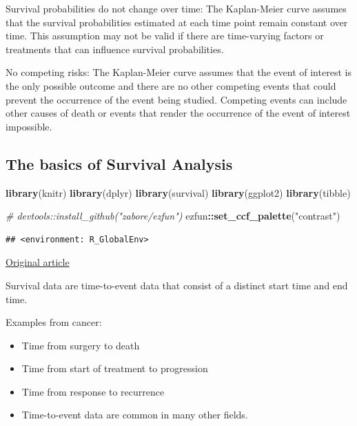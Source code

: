 \documentclass[
]{book}
\newenvironment{Shaded}{\begin{snugshade}}{\end{snugshade}}
\newcommand{\CommentTok}[1]{\textcolor[rgb]{0.56,0.35,0.01}{\textit{#1}}}
\newcommand{\FunctionTok}[1]{\textcolor[rgb]{0.13,0.29,0.53}{\textbf{#1}}}
\newcommand{\NormalTok}[1]{#1}
\newcommand{\SpecialCharTok}[1]{\textcolor[rgb]{0.81,0.36,0.00}{\textbf{#1}}}
\newcommand{\StringTok}[1]{\textcolor[rgb]{0.31,0.60,0.02}{#1}}
\providecommand{\tightlist}{%
  \setlength{\itemsep}{0pt}\setlength{\parskip}{0pt}}
\begin{document}
Survival probabilities do not change over time: The Kaplan-Meier curve assumes that the survival probabilities estimated at each time point remain constant over time. This assumption may not be valid if there are time-varying factors or treatments that can influence survival probabilities.

No competing risks: The Kaplan-Meier curve assumes that the event of interest is the only possible outcome and there are no other competing events that could prevent the occurrence of the event being studied. Competing events can include other causes of death or events that render the occurrence of the event of interest impossible.

\hypertarget{the-basics-of-survival-analysis}{%
\subsection{The basics of Survival Analysis}\label{the-basics-of-survival-analysis}}

\begin{Shaded}
\begin{Highlighting}[]
\FunctionTok{library}\NormalTok{(knitr)}
\FunctionTok{library}\NormalTok{(dplyr)}
\FunctionTok{library}\NormalTok{(survival)}
\FunctionTok{library}\NormalTok{(ggplot2)}
\FunctionTok{library}\NormalTok{(tibble)}

\CommentTok{\# devtools::install\_github("zabore/ezfun")}
\NormalTok{ezfun}\SpecialCharTok{::}\FunctionTok{set\_ccf\_palette}\NormalTok{(}\StringTok{"contrast"}\NormalTok{)}
\end{Highlighting}
\end{Shaded}

\begin{verbatim}
## <environment: R_GlobalEnv>
\end{verbatim}

\href{https://www.emilyzabor.com/tutorials/survival_analysis_in_r_tutorial.html}{Original article}

Survival data are time-to-event data that consist of a distinct start time and end time.

Examples from cancer:

\begin{itemize}
\tightlist
\item
  Time from surgery to death
\item
  Time from start of treatment to progression
\item
  Time from response to recurrence
\item
  Time-to-event data are common in many other fields.
\end{itemize}
\end{document}
